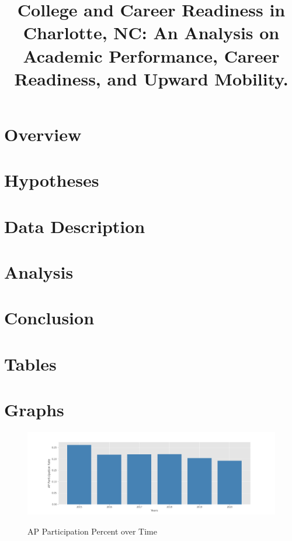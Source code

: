 \documentclass[stu, 12pt, longtable]{apa7}
\title{College and Career Readiness in Charlotte, NC: An Analysis on Academic Performance, Career Readiness, and Upward Mobility.}
\begin{document}
\maketitle

\section{Overview}


\section{Hypotheses}


\section{Data Description}


\section{Analysis}


\section{Conclusion}



\printbibliography

\appendix

\section{Tables}

\newpage






\section{Graphs}
\begin{figure}
    \caption{AP Participation Percent over Time}
    \includegraphics[width=17cm]{AP Participation Rate.png}
    \label{fig1}
\end{figure}
\end{document}

